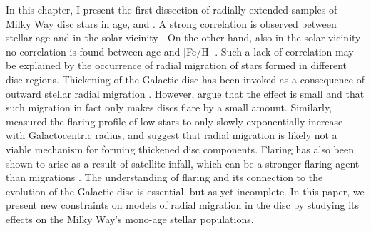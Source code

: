 
 In this chapter, I present the first dissection of radially extended samples of Milky Way disc stars in age, \feh{} and \afe{}. A strong correlation is observed between stellar age and \afe{} in the solar vicinity \citep{2013A&A...560A.109H}. On the other hand, also in the solar vicinity no correlation is found between age and [Fe/H] \citep[e.g.][]{1993A&A...275..101E,2004A&A...418..989N}. Such a lack of correlation may be explained by the occurrence of radial migration of stars formed in different disc regions. Thickening of the Galactic disc has been invoked as a consequence of outward stellar radial migration \citep[e.g.][]{2009MNRAS.399.1145S}. However, \citet{2012A&A...548A.127M} argue that the effect is small and that such migration in fact only makes discs flare by a small amount. Similarly, \citet{2016ApJ...823...30B} measured the flaring profile of low \afe{} stars to only slowly exponentially increase with Galactocentric radius, and suggest that radial migration is likely not a viable mechanism for forming thickened disc components. Flaring has also been shown to arise as a result of satellite infall, which can be a stronger flaring agent than migrations \citep[e.g.][]{2009ApJ...707L...1B}. The understanding of flaring and its connection to the evolution of the Galactic disc is essential, but as yet incomplete. In this paper, we present new constraints on models of radial migration in the disc by studying its effects on the Milky Way's mono-age stellar populations. 

